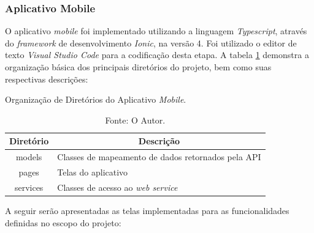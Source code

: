 \subsubsection{Aplicativo Mobile}

O aplicativo \textit{mobile} foi implementado utilizando a linguagem \textit{Typescript}, através do \textit{framework} de desenvolvimento \textit{Ionic}, na versão 4. Foi utilizado o editor de texto \textit{Visual Studio Code} para a codificação desta etapa. A tabela \ref{tabela:app_organizacao} demonstra a organização básica dos principais diretórios do projeto, bem como suas respectivas descrições: 

\renewcommand{\arraystretch}{1.5}
\begin{table}[H]
    \small
	\centering
	\caption{Organização de Diretórios do Aplicativo \textit{Mobile}.}
	\label{tabela:app_organizacao}
	\begin{tabular}{c l}
	    \hline
		\multicolumn{1}{l|}{\textbf{Diretório}} & \multicolumn{1}{c}{\textbf{Descrição}}\\
		\hline
		models & Classes de mapeamento de dados retornados pela API  \\
		pages & Telas do aplicativo \\
		services & Classes de acesso ao \textit{web service} \\
		\hline
	\end{tabular}
	\captionsetup{singlelinecheck = false, format= hang, justification=raggedright, labelsep=space, width=11.9cm}
	\caption*{\footnotesize Fonte: O Autor.}
\end{table}
\renewcommand{\arraystretch}{1}

A seguir serão apresentadas as telas implementadas para as funcionalidades definidas no escopo do projeto:

